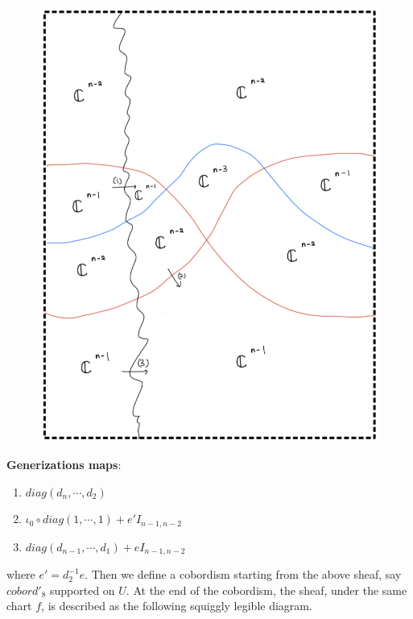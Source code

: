 \begin{figure}[H]
    \centering
    \includegraphics[scale = 0.95]{diagrams/cobord'8/1.png}
    \caption{}
    \label{fig:your-label}
\end{figure}
\textbf{Generizations maps}:
\begin{enumerate}[label = (\arabic*)]
\item $diag(d_n,\cdots,d_2)$
\item $\iota_0 \circ diag(1,\cdots,1) + e'I_{n-1,n-2}$
\item $diag(d_{n-1},\cdots,d_1) + eI_{n-1,n-2}$
\end{enumerate}
where $e' = d_2^{-1}e$. Then we define a cobordism starting from the above sheaf, say $cobord'_8$ supported on $U$. At the end of the cobordism, the sheaf, under the same chart $f$, is described as the following squiggly legible diagram. 
